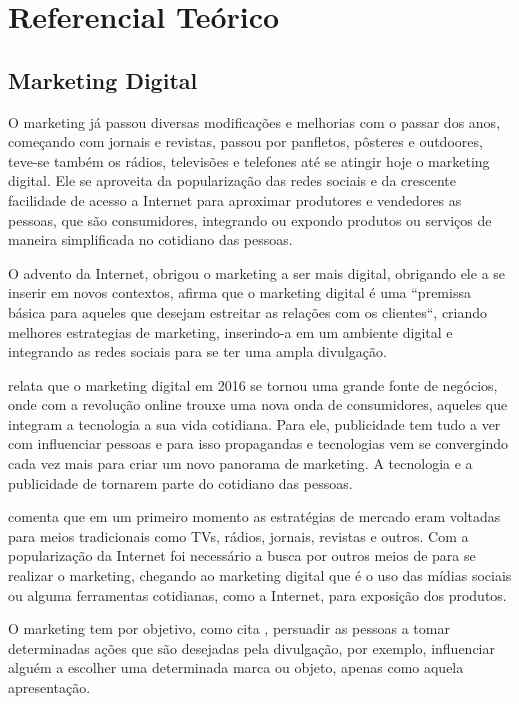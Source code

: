 \chapter[Referencial Teórico]{Referencial Teórico}
\section{Marketing Digital}
O marketing já passou diversas modificações e melhorias com o passar dos anos, começando com jornais e revistas, passou por panfletos, pôsteres e outdoores, teve-se também os rádios, televisões e telefones até se atingir hoje o marketing digital. Ele se aproveita da popularização das redes sociais e da crescente facilidade de acesso a Internet para aproximar produtores e vendedores as pessoas, que são consumidores, integrando ou expondo produtos ou serviços de maneira simplificada no cotidiano das pessoas.

O advento da Internet, obrigou o marketing a ser mais digital, obrigando ele a se inserir em novos contextos, \cite{canto2017} afirma que o marketing digital é uma “premissa básica para aqueles que desejam estreitar as relações com os clientes“, criando melhores estrategias de marketing, inserindo-a em um ambiente digital e integrando as redes sociais para se ter uma ampla divulgação.

\cite[p.2]{ryan2016} relata que o marketing digital em 2016 se tornou uma grande fonte de negócios, onde com a revolução online trouxe uma nova onda de consumidores, aqueles que integram a tecnologia a sua vida cotidiana. Para ele, publicidade tem tudo a ver com influenciar pessoas e para isso propagandas e tecnologias vem se convergindo
cada vez mais para criar um novo panorama de marketing. A tecnologia e a publicidade de tornarem parte do cotidiano das pessoas.

\cite{santos2014} comenta que em um primeiro momento as estratégias de mercado eram voltadas para meios tradicionais como TVs, rádios, jornais, revistas e outros. Com a popularização da Internet foi necessário a busca por outros meios de para se realizar
o marketing, chegando ao marketing digital que é o uso das mídias sociais ou alguma ferramentas cotidianas, como a Internet, para exposição dos produtos.

O marketing tem por objetivo, como cita \cite{ryan2016}, persuadir as pessoas a tomar determinadas ações que são desejadas pela divulgação, por exemplo, influenciar alguém a escolher uma determinada marca ou objeto, apenas como aquela apresentação.

